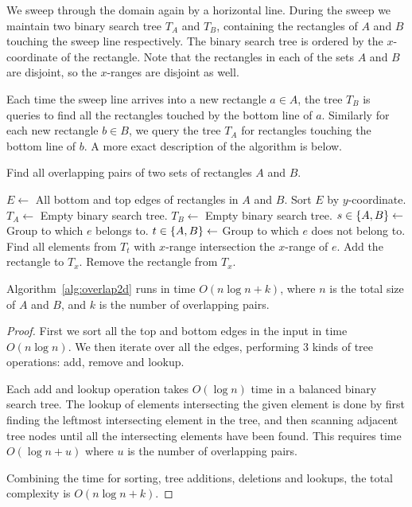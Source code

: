 \documentclass[english,gradu]{tktltiki2018}
\begin{document}
We sweep through the domain again by a horizontal line.
During the sweep we maintain two binary search tree $T_A$ and $T_B$, containing the rectangles of $A$ and $B$ touching the sweep line respectively.
The binary search tree is ordered by the $x$-coordinate of the rectangle.
Note that the rectangles in each of the sets $A$ and $B$ are disjoint, so the $x$-ranges are disjoint as well.

Each time the sweep line arrives into a new rectangle $a\in A$, the tree $T_B$ is queries to find all the rectangles touched by the bottom line of $a$.
Similarly for each new rectangle $b\in B$, we query the tree $T_A$ for rectangles touching the bottom line of $b$.
A more exact description of the algorithm is below.

\begin{alg}\label{alg:overlap2d}
Find all overlapping pairs of two sets of rectangles $A$ and $B$.
\begin{algorithmic}
\State $E\gets$ All bottom and top edges of rectangles in $A$ and $B$.
\State Sort $E$ by $y$-coordinate.
\State $T_A\gets$ Empty binary search tree.
\State $T_B\gets$ Empty binary search tree.
	\State $s\in\left\{A,B\right\}\gets$ Group to which $e$ belongs to.
	\State $t\in\left\{A,B\right\}\gets$ Group to which $e$ does not belong to.
		\State Find all elements from $T_t$ with $x$-range intersection the $x$-range of $e$.
		\State Add the rectangle to $T_x$.
	\Else
		\State Remove the rectangle from $T_x$.
	\EndIf
\EndFor
\end{algorithmic}
\end{alg}

\begin{lem}\label{lem:overlap2dtime}Algorithm~\ref{alg:overlap2d} runs in time $O(n\log n + k)$, where $n$ is the total size of $A$ and $B$, and $k$ is the number of overlapping pairs.\end{lem}
\begin{proof}
First we sort all the top and bottom edges in the input in time $O(n\log n)$.
We then iterate over all the edges, performing 3 kinds of tree operations: add, remove and lookup.

Each add and lookup operation takes $O(\log n)$ time in a balanced binary search tree.
The lookup of elements intersecting the given element is done by first finding the leftmost intersecting element in the tree, and then scanning adjacent tree nodes until all the intersecting elements have been found.
This requires time $O(\log n+u)$ where $u$ is the number of overlapping pairs.

Combining the time for sorting, tree additions, deletions and lookups, the total complexity is $O(n\log n + k)$.
\end{proof}
\end{document}
